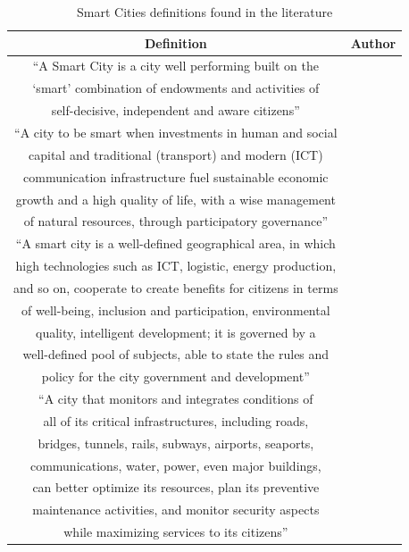 \begin{table}
\centering
\caption{Smart Cities definitions found in the literature}
\label{tab:definicoes}
\smallskip
\begin{tabular}{c|c}
\hline

Definition 
& Author \\\hline

“A Smart City is a city well performing built on the\\
‘smart’ combination of endowments and activities of\\ 
self-decisive, independent and aware citizens” &  \citep{giffinger2007smart} \\\hline

“A city to be smart when investments in human and social\\
capital and traditional (transport) and modern (ICT)\\
communication infrastructure fuel sustainable economic\\ 
growth and a high quality of life, with a wise management\\
of natural resources, through participatory governance”
& \citep{caragliu2011smart}  \\\hline

“A smart city is a well-defined geographical area, in which\\
high technologies such as ICT, logistic, energy production,\\ 
and so on, cooperate to create benefits for citizens in terms\\
of well-being, inclusion and participation, environmental\\
quality, intelligent development; it is governed by a\\ 
well-defined pool of subjects, able to state the rules and\\ 
policy for the city government and development” 
& \citep{dameri2013searching}  \\\hline

“A city that monitors and integrates conditions of \\
all of its critical infrastructures, including roads, \\ 
bridges, tunnels, rails, subways, airports, seaports, \\ 
communications, water, power, even major buildings, \\
can better optimize its resources, plan its preventive \\
maintenance activities, and monitor security aspects \\
while maximizing services to its citizens”
& \citep{hall2000creative} \\\hline


\end{tabular}
\end{table}
